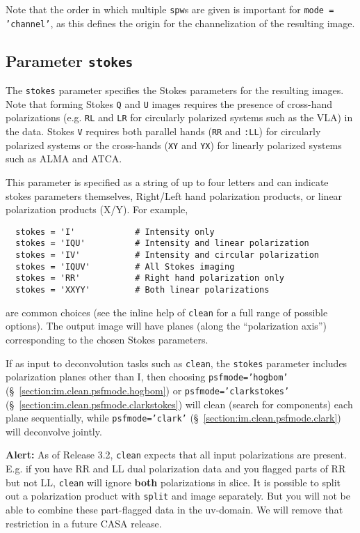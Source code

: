 Note that the order in which multiple {\tt spw}s are given is
important for {\tt mode = 'channel'}, as
this defines the origin for the channelization of the resulting
image.

\subsection{Parameter {\tt stokes} }
\label{section:im.pars.stokes}

The {\tt stokes} parameter specifies the Stokes parameters for the
resulting images.  Note that forming Stokes {\tt Q} and {\tt U} images
requires the presence of
cross-hand polarizations (e.g. {\tt RL} and {\tt LR} for circularly
polarized systems such as the VLA) in the data.  
Stokes {\tt V} requires both parallel
hands ({\tt RR} and {\tt :LL}) for circularly polarized systems or
the cross-hands ({\tt XY} and {\tt YX}) for linearly polarized systems
such as ALMA and ATCA.

This parameter is specified as a string of up to four letters and can
indicate stokes parameters themselves, Right/Left hand polarization
products, or linear polarization products (X/Y). 
For example,
\small
\begin{verbatim}
  stokes = 'I'            # Intensity only
  stokes = 'IQU'          # Intensity and linear polarization
  stokes = 'IV'           # Intensity and circular polarization
  stokes = 'IQUV'         # All Stokes imaging
  stokes = 'RR'           # Right hand polarization only
  stokes = 'XXYY'         # Both linear polarizations 
\end{verbatim}
\normalsize
are common choices (see the inline help of {\tt clean} for a full
range of possible options).
The output image will have planes (along the ``polarization axis'')
corresponding to the chosen Stokes parameters.  

If as input to deconvolution tasks such as {\tt clean}, the {\tt stokes} parameter
includes polarization planes other than I, then choosing {\tt psfmode='hogbom'} 
(\S~\ref{section:im.clean.psfmode.hogbom}) or {\tt psfmode='clarkstokes'} 
(\S~\ref{section:im.clean.psfmode.clarkstokes}) will clean (search for
components) each plane sequentially, while {\tt psfmode='clark'} 
(\S~\ref{section:im.clean.psfmode.clark}) will deconvolve jointly.

{\bf Alert:} As of Release 3.2, {\tt clean} expects that all input
polarizations are present. E.g. if you have RR and LL dual
polarization data and you flagged parts of RR but not LL, {\tt clean} will
ignore {\bf both} polarizations in slice. It is possible to split out a
polarization product with {\tt split} and image separately. But you
will not be able to combine these part-flagged data in the uv-domain. 
We will remove that restriction in a future
CASA release.


